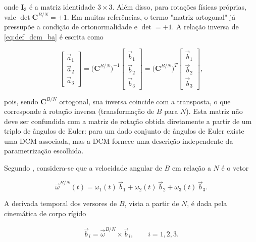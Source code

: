 onde $\mathbf{I}_3$ é a matriz identidade $3\times 3$.
Além disso, para rotações físicas próprias, vale $\det \mathbf{C}^{B/N} = +1$.
Em muitas referências, o termo "matriz ortogonal" já pressupõe a condição de ortonormalidade e $\det=+1$.
A relação inversa de \eqref{eq:def_dcm_ba} é escrita como

\begin{equation}
\begin{bmatrix}
\vec{a}_1 \\
\vec{a}_2 \\
\vec{a}_3
\end{bmatrix}
=
\big(\mathbf{C}^{B/N}\big)^{-1}
\begin{bmatrix}
\vec{b}_1 \\
\vec{b}_2 \\
\vec{b}_3
\end{bmatrix}
=
\big(\mathbf{C}^{B/N}\big)^{T}
\begin{bmatrix}
\vec{b}_1 \\
\vec{b}_2 \\
\vec{b}_3
\end{bmatrix},
\label{eq:relacao_inversa_dcm}
\end{equation}

pois, sendo $\mathbf{C}^{B/N}$ ortogonal, sua inversa coincide com a transposta, o que corresponde à rotação inversa (transformação de $B$ para $N$).
Esta matriz não deve ser confundida com a matriz de rotação obtida diretamente a partir de um triplo de ângulos de Euler: para um dado conjunto de ângulos de Euler existe uma DCM associada, mas a DCM fornece uma descrição independente da parametrização escolhida.


Segundo \cite{wie2008space}, considera-se que a velocidade angular de $B$ em relação a $N$ é o vetor

\begin{equation}
\vec{\omega}^{B/N}(t)
=
\omega_1(t)\,\vec{b}_1
+
\omega_2(t)\,\vec{b}_2
+
\omega_3(t)\,\vec{b}_3.
\end{equation}

A derivada temporal dos versores de $B$, vista a partir de $N$, é dada pela cinemática de corpo rígido

\begin{equation}
\dot{\vec{b}}_i = \vec{\omega}^{B/N} \times \vec{b}_i,
\qquad i = 1,2,3.
\label{eq:derivada_b_i}
\end{equation}

